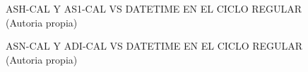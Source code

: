 \begin{figure}[H]
  \hfill
  \hfill
  \hfill
  \caption{ASH-CAL Y AS1-CAL VS DATETIME EN EL CICLO REGULAR (Autoria propia)}
  \end{figure}
\begin{figure}[H]
  \hfill
  \hfill
  \hfill
  \caption{ASN-CAL Y ADI-CAL VS DATETIME EN EL CICLO REGULAR (Autoria propia)}
  \end{figure}
